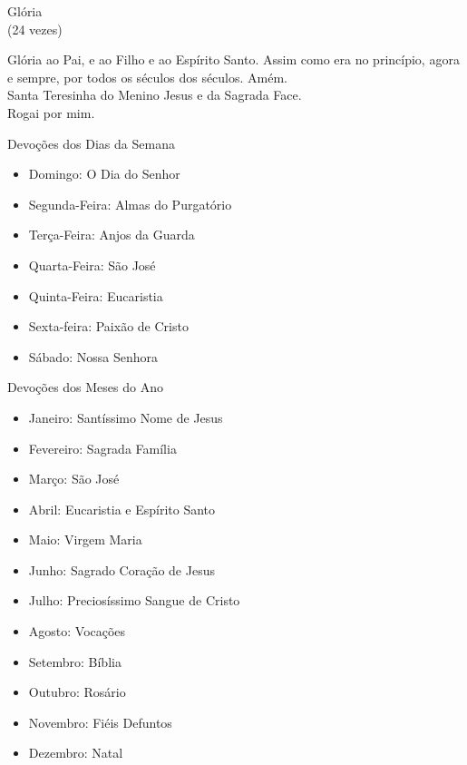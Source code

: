 \documentclass{book}
\begin{document}
\begin{center}
    Glória \\ \textcolor{VioletRed2}{\scriptsize{(24 vezes)}}
\end{center}
\begin{flushleft}
    Glória ao Pai, e ao Filho e ao Espírito Santo. Assim como era no princípio, agora e sempre, por todos os séculos dos séculos. Amém.
    \vspace{.2cm} \\
    \VbarRed{} Santa Teresinha do Menino Jesus e da Sagrada Face. \\
    \RbarRed{} Rogai por mim.
\end{flushleft}
\newpage
\begin{center}
    Devoções dos Dias da Semana
\end{center}
\begin{itemize}
    \item Domingo: O Dia do Senhor
    \item Segunda-Feira: Almas do Purgatório
    \item Terça-Feira: Anjos da Guarda
    \item Quarta-Feira: São José
    \item Quinta-Feira: Eucaristia
    \item Sexta-feira: Paixão de Cristo
    \item Sábado: Nossa Senhora
\end{itemize}
\begin{center}
    Devoções dos Meses do Ano
\end{center}
\begin{itemize}
    \item Janeiro: Santíssimo Nome de Jesus
    \item Fevereiro: Sagrada Família
    \item Março: São José
    \item Abril: Eucaristia e Espírito Santo
    \item Maio: Virgem Maria
    \item Junho: Sagrado Coração de Jesus
    \item Julho: Preciosíssimo Sangue de Cristo
    \item Agosto: Vocações
    \item Setembro: Bíblia
    \item Outubro: Rosário
    \item Novembro: Fiéis Defuntos
    \item Dezembro: Natal
\end{itemize}
\end{document}
